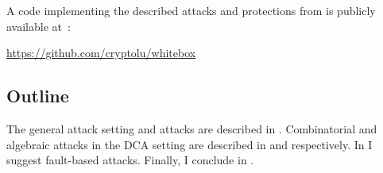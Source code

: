 
A code implementing the described attacks and protections from  is publicly available at~\cite{OurWhiteboxCode}:
\begin{center}
    \url{https://github.com/cryptolu/whitebox}
\end{center}

\subsection{Outline}
The general attack setting and attacks are described in . Combinatorial and algebraic attacks in the DCA setting are described in  and  respectively. In  I suggest fault-based attacks.
Finally, I conclude in .